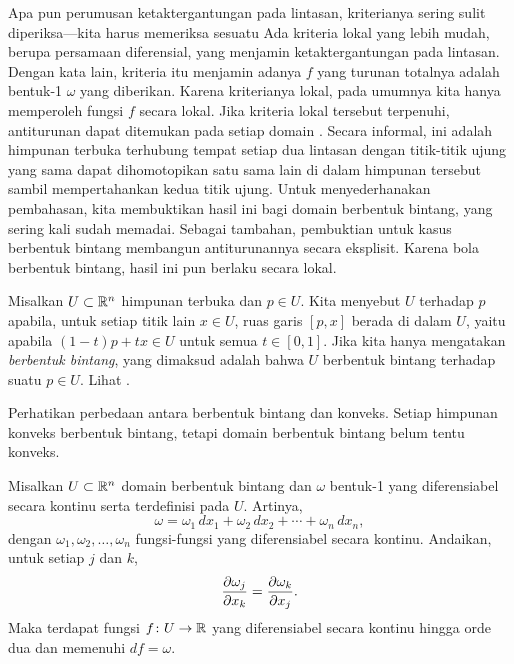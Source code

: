 Apa pun perumusan ketaktergantungan pada lintasan, kriterianya sering sulit
diperiksa---kita harus memeriksa sesuatu 
Ada kriteria lokal yang lebih mudah, berupa persamaan diferensial, yang menjamin
ketaktergantungan pada lintasan. Dengan kata lain, kriteria itu menjamin adanya
\emph{} $f$ yang turunan totalnya adalah bentuk-1
$\omega$ yang diberikan. Karena kriterianya lokal, pada umumnya kita hanya
memperoleh fungsi $f$ secara lokal.
Jika kriteria lokal tersebut terpenuhi, antiturunan dapat ditemukan pada setiap
domain
\emph{}. Secara informal, ini adalah himpunan
terbuka terhubung tempat setiap dua lintasan dengan titik-titik ujung yang sama
dapat dihomotopikan satu sama lain di dalam himpunan tersebut sambil
mempertahankan kedua titik ujung. Untuk menyederhanakan pembahasan, kita
membuktikan hasil ini bagi domain berbentuk bintang, yang sering kali sudah
memadai. Sebagai tambahan, pembuktian untuk kasus berbentuk bintang membangun
antiturunannya secara eksplisit. Karena bola berbentuk bintang, hasil ini pun
berlaku secara lokal.

\begin{defn}
Misalkan $U \subset {\mathbb{R}}^n$ himpunan terbuka dan $p \in U$. Kita menyebut $U$
\emph{}
terhadap $p$ apabila, untuk setiap titik lain $x \in U$, ruas garis $[p,x]$
berada di dalam $U$, yaitu apabila
$(1-t)p + tx \in U$ untuk semua $t \in [0,1]$.
Jika kita hanya mengatakan \emph{berbentuk bintang}, yang dimaksud adalah bahwa
$U$ berbentuk bintang terhadap suatu $p \in U$. Lihat
.
\begin{myfigureht}
\caption{Domain berbentuk bintang terhadap $p$.\label{fig:starshaped}}
\end{myfigureht}
\end{defn}

Perhatikan perbedaan antara berbentuk bintang dan konveks. Setiap himpunan
konveks berbentuk bintang, tetapi domain berbentuk bintang belum tentu konveks.

\begin{thm}
Misalkan $U \subset {\mathbb{R}}^n$ domain berbentuk bintang dan $\omega$ bentuk-1 yang
diferensiabel secara kontinu serta terdefinisi pada $U$. Artinya,
\begin{equation*}
\omega =
\omega_1 \,dx_1 +
\omega_2 \,dx_2 + \cdots +
\omega_n \,dx_n ,
\end{equation*}
dengan $\omega_1,\omega_2,\ldots,\omega_n$ fungsi-fungsi yang diferensiabel
secara kontinu. Andaikan, untuk setiap $j$ dan $k$,
\begin{equation*}
\frac{\partial \omega_j}{\partial x_k} = \frac{\partial \omega_k}{\partial x_j} .
\avoidbreak
\end{equation*}
Maka terdapat fungsi $f \colon U \to {\mathbb{R}}$ yang diferensiabel secara kontinu
hingga orde dua dan memenuhi $df = \omega$.
\end{thm}

